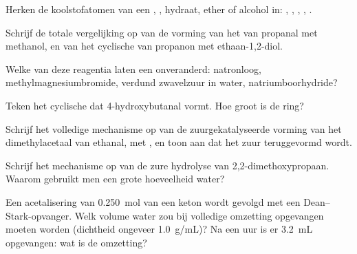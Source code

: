 \begin{exercise}[$\star$]\label{exo:b1:acetals-protection:1}
Herken de koolstofatomen van een , , hydraat, ether of
alcohol in: , , ,
, .
\end{exercise}

\begin{exercise}[$\star$]\label{exo:b1:acetals-protection:2}
Schrijf de totale vergelijking op van de vorming van het  van
propanal met methanol, en van het cyclische  van propanon met
ethaan-1,2-diol.
\end{exercise}

\begin{exercise}[$\star$]\label{exo:b1:acetals-protection:3}
Welke van deze reagentia laten een  onveranderd: natronloog,
methylmagnesiumbromide, verdund zwavelzuur in water,
natriumboorhydride?
\end{exercise}

\begin{exercise}[$\star$]\label{exo:b1:acetals-protection:4}
Teken het cyclische  dat 4-hydroxybutanal vormt. Hoe groot is
de ring?
\end{exercise}

\begin{exercise}[$\star\star$]\label{exo:b1:acetals-protection:5}
Schrijf het volledige mechanisme op van de zuurgekatalyseerde vorming van
het dimethylacetaal van ethanal, met , en toon aan dat het
zuur teruggevormd wordt.
\end{exercise}

\begin{exercise}[$\star\star$]\label{exo:b1:acetals-protection:6}
Schrijf het mechanisme op van de zure hydrolyse van
2,2-dimethoxypropaan. Waarom gebruikt men een grote hoeveelheid water?
\end{exercise}

\begin{exercise}[$\star\star$]\label{exo:b1:acetals-protection:7}
Een acetalisering van \qty{0.250}{mol} van een keton wordt gevolgd met
een Dean--Stark-opvanger. Welk volume water zou bij volledige omzetting
opgevangen moeten worden (dichtheid ongeveer \qty{1.0}{g/mL})? Na een uur
is er \qty{3.2}{mL} opgevangen: wat is de omzetting?
\end{exercise}

